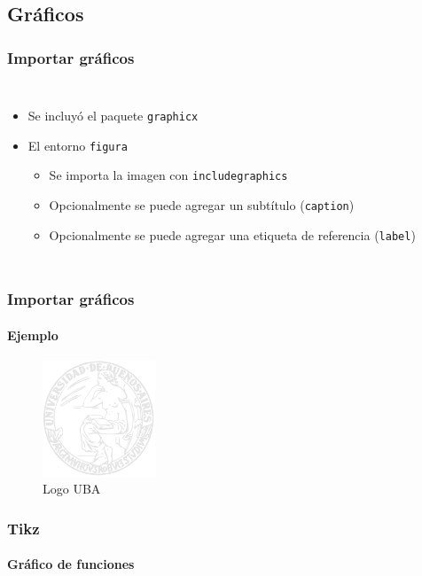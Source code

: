 \documentclass[svgnames]{beamer}
\begin{document}
\subsection{Gráficos}

\begin{frame}[fragile]
  \frametitle{Importar gráficos}
  \begin{columns}
    \centering
      
    \centering
      \begin{itemize}
        \item Se incluyó el paquete \texttt{graphicx}
        \item El entorno \texttt{figura}
        \begin{itemize}
            \item Se importa la imagen con \texttt{includegraphics}
            \item Opcionalmente se puede agregar un subtítulo (\texttt{caption})
            \item Opcionalmente se puede agregar una etiqueta de referencia (\texttt{label})
        \end{itemize}
      \end{itemize}
  \end{columns}
\end{frame}

\begin{frame}[fragile]
  \frametitle{Importar gráficos}
  \framesubtitle{Ejemplo}
  
  \begin{figure}
    \includegraphics[width=0.3\textwidth]{graficos/logo_uba}
    \caption{Logo UBA}
    \label{fig:logo_uba}
  \end{figure}
\end{frame}

\begin{frame}[fragile]
  \frametitle{Tikz}
  \framesubtitle{Gráfico de funciones}
    \begin{center}
    \end{center}
\end{frame}
\end{document}
